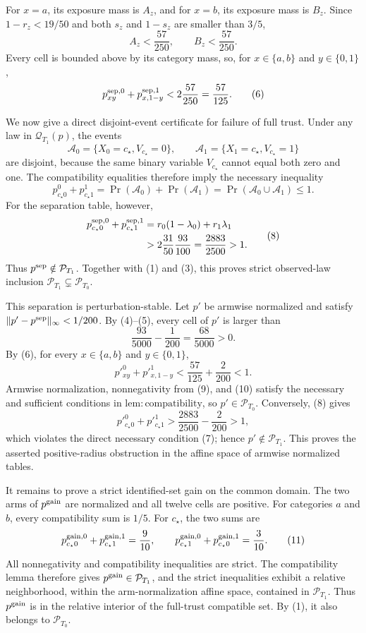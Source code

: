 For \(x=a\), its exposure mass is \(A_z\), and for \(x=b\), its exposure mass is \(B_z\).  Since \(1-r_z<19/50\) and both \(s_z\) and \(1-s_z\) are smaller than \(3/5\),
\[
 A_z<\frac{57}{250},
 \qquad B_z<\frac{57}{250}.
\]
Every cell is bounded above by its category mass, so, for \(x\in\{a,b\}\) and \(y\in\{0,1\}\),
\[
 p^{{\rm sep},0}_{xy}+p^{{\rm sep},1}_{x,1-y}
 <2\frac{57}{250}=\frac{57}{125}.
 \tag{6}
\]

We now give a direct disjoint-event certificate for failure of full trust.  Under any law in \(\mathcal Q_{T_1}(p)\), the events
\[
 \mathcal A_0=\{X_0=c_\star,V_{c_\star}=0\},
 \qquad
 \mathcal A_1=\{X_1=c_\star,V_{c_\star}=1\}
\]
are disjoint, because the same binary variable \(V_{c_\star}\) cannot equal both zero and one.  The compatibility equalities therefore imply the necessary inequality
\[
 p^0_{c_\star0}+p^1_{c_\star1}
 =\Pr(\mathcal A_0)+\Pr(\mathcal A_1)
 =\Pr(\mathcal A_0\cup\mathcal A_1)\leq1.
 \tag{7}
\]
For the separation table, however,
\[
\begin{aligned}
 p^{{\rm sep},0}_{c_\star0}+p^{{\rm sep},1}_{c_\star1}
 &=r_0(1-\lambda_0)+r_1\lambda_1\\
 &>2\frac{31}{50}\frac{93}{100}
 =\frac{2883}{2500}>1.
\end{aligned}
\tag{8}
\]
Thus \(p^{\rm sep}\notin\mathcal P_{T_1}\).  Together with (1) and (3), this proves strict observed-law inclusion \(\mathcal P_{T_1}\subsetneq\mathcal P_{T_0}\).

This separation is perturbation-stable.  Let \(p'\) be armwise normalized and satisfy
\(\lVert p'-p^{\rm sep}\rVert_\infty<1/200\).  By (4)--(5), every cell of \(p'\) is larger than
\[
 \frac{93}{5000}-\frac1{200}=\frac{68}{5000}>0.
 \tag{9}
\]
By (6), for every \(x\in\{a,b\}\) and \(y\in\{0,1\}\),
\[
 p'^0_{xy}+p'^1_{x,1-y}
 <\frac{57}{125}+\frac2{200}<1.
 \tag{10}
\]
Armwise normalization, nonnegativity from (9), and (10) satisfy the necessary and sufficient conditions in \(\mathrm{lem{:}compatibility}\), so \(p'\in\mathcal P_{T_0}\).  Conversely, (8) gives
\[
 p'^0_{c_\star0}+p'^1_{c_\star1}
 >\frac{2883}{2500}-\frac2{200}>1,
\]
which violates the direct necessary condition (7); hence \(p'\notin\mathcal P_{T_1}\).  This proves the asserted positive-radius obstruction in the affine space of armwise normalized tables.

It remains to prove a strict identified-set gain on the common domain.  The two arms of \(p^{\rm gain}\) are normalized and all twelve cells are positive.  For categories \(a\) and \(b\), every compatibility sum is \(1/5\).  For \(c_\star\), the two sums are
\[
 p^{{\rm gain},0}_{c_\star0}+p^{{\rm gain},1}_{c_\star1}=\frac9{10},
 \qquad
 p^{{\rm gain},0}_{c_\star1}+p^{{\rm gain},1}_{c_\star0}=\frac3{10}.
 \tag{11}
\]
All nonnegativity and compatibility inequalities are strict.  The compatibility lemma therefore gives \(p^{\rm gain}\in\mathcal P_{T_1}\), and the strict inequalities exhibit a relative neighborhood, within the arm-normalization affine space, contained in \(\mathcal P_{T_1}\).  Thus \(p^{\rm gain}\) is in the relative interior of the full-trust compatible set.  By (1), it also belongs to \(\mathcal P_{T_0}\).

